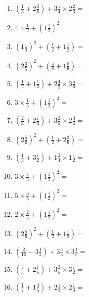 \documentclass[12pt]{article}
\begin{document}
\begin{enumerate}
\item \large $ (\frac{1}{3} + 2 \frac{3}{6}) + 3 \frac{1}{4} \times 2 \frac{2}{3} = $ \vspace{1.8cm}
\item \large $ 4 \times \frac{1}{2} + (1 \frac{1}{2})^2 = $ \vspace{1.8cm}
\item \large $ (1 \frac{1}{3})^2 + (\frac{1}{2} + 1 \frac{1}{2}) = $ \vspace{1.8cm}
\item \large $ (2 \frac{3}{5})^2 + (\frac{4}{8} + 1 \frac{5}{6}) = $ \vspace{1.8cm}
\item \large $ (\frac{1}{2} + 1 \frac{1}{2}) + 2 \frac{4}{5} \times 3 \frac{5}{6} = $ \vspace{1.8cm}
\item \large $ 3 \times \frac{1}{5} + (1 \frac{1}{2})^2 = $ \vspace{1.8cm}
\newpage
\item \large $ (\frac{2}{3} + 2 \frac{1}{3}) + 3 \frac{2}{5} \times 2 \frac{3}{4} = $ \vspace{1.8cm}
\item \large $ (2 \frac{5}{6})^2 + (\frac{1}{2} + 2 \frac{3}{6}) = $ \vspace{1.8cm}
\item \large $ (\frac{1}{3} + 3 \frac{1}{2}) + 1 \frac{2}{4} \times 1 \frac{1}{2} = $ \vspace{1.8cm}
\item \large $ 3 \times \frac{4}{5} + (1 \frac{1}{2})^2 = $ \vspace{1.8cm}
\item \large $ 5 \times \frac{3}{5} + (1 \frac{1}{2})^2 = $ \vspace{1.8cm}
\item \large $ 2 \times \frac{2}{5} + (1 \frac{1}{2})^2 = $ \vspace{1.8cm}
\item \large $ (2 \frac{5}{6})^2 + (\frac{1}{2} + 1 \frac{1}{2}) = $ \vspace{1.8cm}
\item \large $ (\frac{2}{10} + 3 \frac{1}{3}) + 3 \frac{4}{5} \times 3 \frac{1}{5} = $ \vspace{1.8cm}
\item \large $ (\frac{3}{5} + 2 \frac{1}{5}) + 3 \frac{2}{5} \times 3 \frac{1}{2} = $ \vspace{1.8cm}
\item \large $ (\frac{1}{2} + 1 \frac{4}{5}) + 2 \frac{1}{3} \times 2 \frac{1}{3} = $ \vspace{1.8cm}

\end{enumerate}
\end{document}

